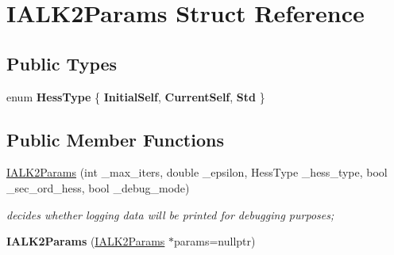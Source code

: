 \hypertarget{structIALK2Params}{\section{I\-A\-L\-K2\-Params Struct Reference}
\label{structIALK2Params}
}
\subsection*{Public Types}
\begin{DoxyCompactItemize}
\item 
enum {\bfseries Hess\-Type} \{ {\bfseries Initial\-Self}, 
{\bfseries Current\-Self}, 
{\bfseries Std}
 \}
\end{DoxyCompactItemize}
\subsection*{Public Member Functions}
\begin{DoxyCompactItemize}
\item 
\hyperlink{structIALK2Params_aa4414dc3fa55e3a72441f0cd6cff6385}{I\-A\-L\-K2\-Params} (int \-\_\-max\-\_\-iters, double \-\_\-epsilon, Hess\-Type \-\_\-hess\-\_\-type, bool \-\_\-sec\-\_\-ord\-\_\-hess, bool \-\_\-debug\-\_\-mode)
\begin{DoxyCompactList}\small\item\em decides whether logging data will be printed for debugging purposes; \end{DoxyCompactList}\item 
\hypertarget{structIALK2Params_aead4476bbe6cff177f438fbaad1de8c8}{{\bfseries I\-A\-L\-K2\-Params} (\hyperlink{structIALK2Params}{I\-A\-L\-K2\-Params} $\ast$params=nullptr)}\label{structIALK2Params_aead4476bbe6cff177f438fbaad1de8c8}

\end{DoxyCompactItemize}
